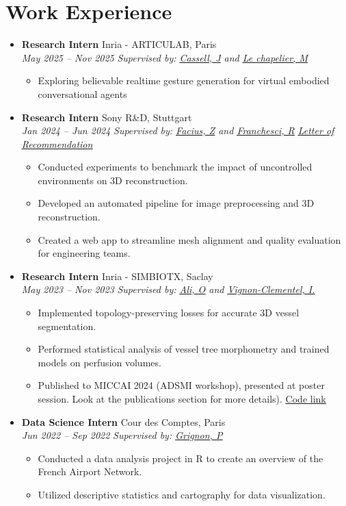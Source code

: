 \documentclass[letterpaper,11pt,twocolumn]{article}
\newcommand{\resumeItem}[1]{\item \small{#1}}
\newcommand{\resumeSubheading}[4]{
  \vspace{-2pt}\item \textbf{#1} \hfill #2 \\
  \textit{\small #3} \hfill \textit{\small #4} 
  \vspace{-7pt}
}
\newcommand{\resumeItemListStart}{\begin{itemize}[leftmargin=*]}
\newcommand{\resumeItemListEnd}{\end{itemize}\vspace{-5pt}}
\begin{document}
\section{Work Experience}
\begin{itemize}[leftmargin=*]
  \resumeSubheading
    {Research Intern}{Inria - ARTICULAB, Paris}{May 2025 -- Nov 2025}{\textit{Supervised by: \href{https://scholar.google.com/citations?user=wkC9xHMAAAAJ&hl=en}{\underline{Cassell, J}} and \href{https://fr.linkedin.com/in/marius-le-chapelier-7694b5172}{\underline{Le chapelier, M}}}} 
    
  \resumeItemListStart
    \resumeItem{Exploring believable realtime gesture generation for virtual embodied conversational agents}
  \resumeItemListEnd
    
  \resumeSubheading
    {Research Intern}{Sony R\&D, Stuttgart}{Jan 2024 -- Jun 2024}{\textit{Supervised by: \href{https://de.linkedin.com/in/zoltan-facius-6b424112}{\underline{Facius, Z}} and \href{https://de.linkedin.com/in/roberto-franceschi}{\underline{Franchesci, R}}} \vspace{5pt} \href{https://machtayassine.github.io/resume/Sony_LoR.pdf}{\underline{\textit{Letter of Recommendation}}}}
    
  \resumeItemListStart
    \resumeItem{Conducted experiments to benchmark the impact of uncontrolled environments on 3D reconstruction.}
    \resumeItem{Developed an automated pipeline for image preprocessing and 3D reconstruction.}
    \resumeItem{Created a web app to streamline mesh alignment and quality evaluation for engineering teams.}
  \resumeItemListEnd

  \resumeSubheading
    {Research Intern}{Inria - SIMBIOTX, Saclay}{May 2023 -- Nov 2023}{\textit{Supervised by: \href{https://scholar.google.com/citations?user=tKRo0ewAAAAJ&hl=en}{\underline{Ali, O}} and \href{https://team.inria.fr/simbiotx/team-members/irene-vignon-clementel/}{\underline{Vignon-Clementel, I.}}}}
    
  \resumeItemListStart
    \resumeItem{Implemented topology-preserving losses for accurate 3D vessel segmentation.}
    \resumeItem{Performed statistical analysis of vessel tree morphometry and trained models on perfusion volumes.}
    \resumeItem{Published to MICCAI 2024 (ADSMI workshop), presented at poster session. Look at the publications section for more details).} \underline{\href{https://gitlab.inria.fr/simbiotx/LiverVesselSeg}{Code link}}
  \resumeItemListEnd

  \resumeSubheading
    {Data Science Intern}{Cour des Comptes, Paris}{Jun 2022 -- Sep 2022}{\textit{Supervised by: \href{https://fr.linkedin.com/in/paulgrignon}{\underline{Grignon, P}}}}
    
  \resumeItemListStart
    \resumeItem{Conducted a data analysis project in R to create an overview of the French Airport Network.}
    \resumeItem{Utilized descriptive statistics and cartography for data visualization.}
  \resumeItemListEnd
\end{itemize}
\end{document}
